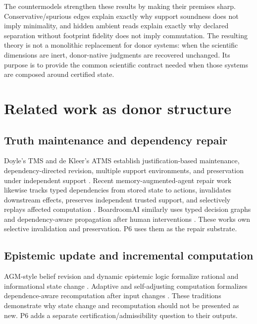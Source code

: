 \documentclass[11pt]{article}
\begin{document}
The countermodels strengthen these results by making their premises sharp. Conservative/spurious edges explain exactly why support soundness does not imply minimality, and hidden ambient reads explain exactly why declared separation without footprint fidelity does not imply commutation. The resulting theory is not a monolithic replacement for donor systems: when the scientific dimensions are inert, donor-native judgments are recovered unchanged. Its purpose is to provide the common scientific contract needed when those systems are composed around certified state.

\section{Related work as donor structure}
\subsection{Truth maintenance and dependency repair}
Doyle's TMS and de Kleer's ATMS establish justification-based maintenance, dependency-directed revision, multiple support environments, and preservation under independent support \cite{doyle1979,dekleer1986a,dekleer1986b}. Recent memory-augmented-agent repair work likewise tracks typed dependencies from stored state to actions, invalidates downstream effects, preserves independent trusted support, and selectively replays affected computation \cite{rollback2026}. BoardroomAI similarly uses typed decision graphs and dependency-aware propagation after human interventions \cite{boardroom2026}. These works own selective invalidation and preservation. P6 uses them as the repair substrate.

\subsection{Epistemic update and incremental computation}
AGM-style belief revision and dynamic epistemic logic formalize rational and informational state change \cite{agm1985,del2007}. Adaptive and self-adjusting computation formalizes dependence-aware recomputation after input changes \cite{acar2002}. These traditions demonstrate why state change and recomputation should not be presented as new. P6 adds a separate certification\slash admissibility question to their outputs.
\end{document}
